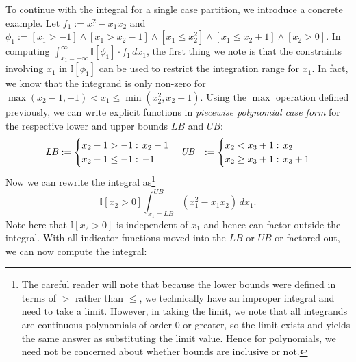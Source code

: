 \documentclass[letterpaper]{article}
\newcommand{\LB}{\mathit{LB}}
\newcommand{\UB}{\mathit{UB}}
\newcommand{\I}{\mathbb{I}}
\begin{document}
{To continue with the integral for a single case partition, we
introduce a concrete example.  Let $f_1 := x_1^2 - x_1 x_2$ and $\phi_1
:= [x_1 > -1] \land [x_1 > x_2-1] \land [x_1 \leq x_2^2] \land [x_1 \leq x_2 +1] \land [x_2 > 0]$.  
In computing $\int_{x_1=-\infty}^{\infty} \I[\phi_1] \cdot f_1 \, dx_1$,
the first thing we note is that the constraints involving $x_1$ in
$\I[\phi_1]$ can be used to restrict the integration range for $x_1$.
In fact, we know that the integrand is only non-zero for
$\max(x_2 - 1, -1) < x_1 \leq \min(x_2^2,x_2 + 1)$.  Using the $\max$
operation defined previously, we can 
write explicit functions in 
\emph{piecewise polynomial case form} for the respective 
lower and upper bounds $\LB$ and $\UB$:
{\footnotesize
\vspace{-2mm}
\begin{align*}
\LB &:=\begin{cases}
    x_2-1 > -1:&\hspace{-2mm} x_2 - 1 \\ 
    x_2-1 \leq -1:&\hspace{-2mm} -1 \\ 
  \end{cases}\quad
\UB &:=\begin{cases}
    x_2<x_3+1:&\hspace{-2mm} x_2 \\ 
    x_2\geq x_3+1:&\hspace{-2mm} x_3 + 1 \\ 
  \end{cases}
\end{align*}
}
Now we can rewrite the integral as\footnote{The careful reader will note
that because the lower bounds were defined in terms of $>$
rather than $\leq$, we technically have an improper integral
and need to take a limit.  However, in taking the limit, we
note that all integrands are continuous polynomials
of order 0 or greater, so the limit exists and yields the
same answer as substituting the limit value.  Hence for 
polynomials, we need not be concerned about whether bounds
are inclusive or not.}
\vspace{-2mm}
\begin{equation}
\I[x_2 > 0] \int_{x_1=\LB}^{\UB} (x_1^2 - x_1 x_2) \, dx_1 .
\end{equation}
Note here that $\I[x_2 > 0]$ is independent of $x_1$ and hence
can factor outside the integral.  With all indicator functions
moved into the $\LB$ or $\UB$ or factored out, we can now compute
the integral:
\vspace{-5mm}
}
\end{document}
